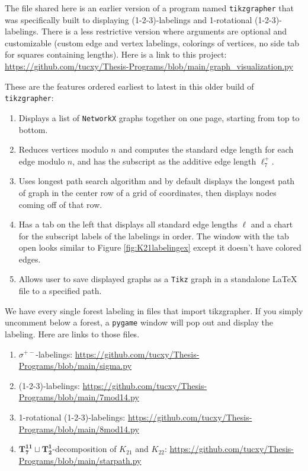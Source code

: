 The file shared here is an earlier version of a program named \verb|tikzgrapher| that was specifically built to displaying (1-2-3)-labelings and 1-rotational (1-2-3)-labelings. There is a less restrictive version where arguments are optional and customizable (custom edge and vertex labelings, colorings of vertices, no side tab for squares containing lengths). Here is a link to this project: \url{https://github.com/tucxy/Thesis-Programs/blob/main/graph_visualization.py}

These are the features ordered earliest to latest in this older build of \verb|tikzgrapher|:\newline
{}
\begin{enumerate}
  \item Displays a list of \verb|NetworkX| graphs together on one page, starting from top to bottom.
  \item Reduces vertices modulo $n$ and computes the standard edge length for each edge modulo $n$, and has the subscript as the additive edge length $\ell_{7}^{+}$.
  \item Uses longest path search algorithm and by default displays the longest path of graph in the center row of a grid of coordinates, then displays nodes coming off of that row.
  \item Has a tab on the left that displays all standard edge lengths $\ell$ and a chart for the subscript labels of the labelings in order. The window with the tab open looks similar to Figure \ref{fig:K21labelingex} except it doesn't have colored edges.
  \item Allows user to save displayed graphs as a \verb|Tikz| graph in a standalone \LaTeX$\,$file to a specified path.
\end{enumerate}
We have every single forest labeling in files that import tikzgrapher. If you simply uncomment below a forest, a \verb|pygame| window will pop out and display the labeling. Here are links to those files.
\begin{enumerate}
  \item $\sigma^{+-}$-labelings: \url{https://github.com/tucxy/Thesis-Programs/blob/main/sigma.py}
  \item (1-2-3)-labelings: \url{https://github.com/tucxy/Thesis-Programs/blob/main/7mod14.py}
  \item 1-rotational (1-2-3)-labelings: \url{https://github.com/tucxy/Thesis-Programs/blob/main/8mod14.py}
  \item $\mathbf{T_{7}^{11}\sqcup T_{2}^{1}}$-decomposition of $K_{21}$ and $K_{22}$: \url{https://github.com/tucxy/Thesis-Programs/blob/main/starpath.py}
\end{enumerate}


